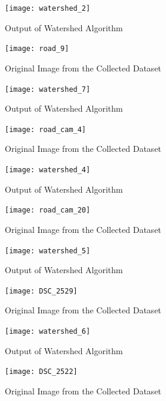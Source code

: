 \begin{enumerate}
\begin{enumerate}
    \begin{figure}[ht!]
        \centering
        \texttt{[image: watershed\_2]}
        \caption{Output of Watershed Algorithm}
    \end{figure}
    \pagebreak
    
    \begin{figure}[ht!]
        \centering
        \texttt{[image: road\_9]}
        \caption{Original Image from the Collected Dataset}
    \end{figure}

    \begin{figure}[ht!]
        \centering
        \texttt{[image: watershed\_7]}
        \caption{Output of Watershed Algorithm}
    \end{figure}
    \pagebreak
    
    \begin{figure}[ht!]
        \centering
        \texttt{[image: road\_cam\_4]}
        \caption{Original Image from the Collected Dataset}
    \end{figure}

    \begin{figure}[ht!]
        \centering
        \texttt{[image: watershed\_4]}
        \caption{Output of Watershed Algorithm}
    \end{figure}
    \pagebreak
    
    \begin{figure}[ht!]
        \centering
        \texttt{[image: road\_cam\_20]}
        \caption{Original Image from the Collected Dataset}
    \end{figure}

    \begin{figure}[ht!]
        \centering
        \texttt{[image: watershed\_5]}
        \caption{Output of Watershed Algorithm}
    \end{figure}
    \pagebreak
    
    \begin{figure}[ht!]
        \centering
        \texttt{[image: DSC\_2529]}
        \caption{Original Image from the Collected Dataset}
    \end{figure}

    \begin{figure}[ht!]
        \centering
        \texttt{[image: watershed\_6]}
        \caption{Output of Watershed Algorithm}
    \end{figure}
    \pagebreak
    
    \begin{figure}[ht!]
        \centering
        \texttt{[image: DSC\_2522]}
        \caption{Original Image from the Collected Dataset}
    \end{figure}


\end{enumerate}
\end{enumerate}
